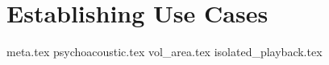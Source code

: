 \chapter{Establishing Use Cases}\label{cha:establishing_use_cases}
{meta.tex}
{psychoacoustic.tex}
{vol_area.tex}
{isolated_playback.tex}
